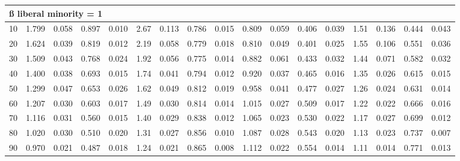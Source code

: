 \documentclass[
]{article}
\begin{document}
\begin{table}[H]
\begin{table}
{\begin{tabular}{r|r|r|r|r|r|r|r|r|r|r|r|r|r|r|r|r}
\hline
\multicolumn{17}{l}{\textbf{ß liberal minority = 1}}\\
\hline
\hspace{1em}10 & 1.799 & 0.058 & 0.897 & 0.010 & 2.67 & 0.113 & 0.786 & 0.015 & 0.809 & 0.059 & 0.406 & 0.039 & 1.51 & 0.136 & 0.444 & 0.043\\
\hline
\hspace{1em}20 & 1.624 & 0.039 & 0.819 & 0.012 & 2.19 & 0.058 & 0.779 & 0.018 & 0.810 & 0.049 & 0.401 & 0.025 & 1.55 & 0.106 & 0.551 & 0.036\\
\hline
\hspace{1em}30 & 1.509 & 0.043 & 0.768 & 0.024 & 1.92 & 0.056 & 0.775 & 0.014 & 0.882 & 0.061 & 0.433 & 0.032 & 1.44 & 0.071 & 0.582 & 0.032\\
\hline
\hspace{1em}40 & 1.400 & 0.038 & 0.693 & 0.015 & 1.74 & 0.041 & 0.794 & 0.012 & 0.920 & 0.037 & 0.465 & 0.016 & 1.35 & 0.026 & 0.615 & 0.015\\
\hline
\hspace{1em}50 & 1.299 & 0.047 & 0.653 & 0.026 & 1.62 & 0.049 & 0.812 & 0.019 & 0.958 & 0.041 & 0.477 & 0.027 & 1.26 & 0.024 & 0.631 & 0.014\\
\hline
\hspace{1em}60 & 1.207 & 0.030 & 0.603 & 0.017 & 1.49 & 0.030 & 0.814 & 0.014 & 1.015 & 0.027 & 0.509 & 0.017 & 1.22 & 0.022 & 0.666 & 0.016\\
\hline
\hspace{1em}70 & 1.116 & 0.031 & 0.560 & 0.015 & 1.40 & 0.029 & 0.838 & 0.012 & 1.065 & 0.023 & 0.530 & 0.022 & 1.17 & 0.027 & 0.699 & 0.012\\
\hline
\hspace{1em}80 & 1.020 & 0.030 & 0.510 & 0.020 & 1.31 & 0.027 & 0.856 & 0.010 & 1.087 & 0.028 & 0.543 & 0.020 & 1.13 & 0.023 & 0.737 & 0.007\\
\hline
\hspace{1em}90 & 0.970 & 0.021 & 0.487 & 0.018 & 1.24 & 0.021 & 0.865 & 0.008 & 1.112 & 0.022 & 0.554 & 0.014 & 1.11 & 0.014 & 0.771 & 0.013\\
\hline
\end{tabular}}
\end{table}
\end{table}
\end{document}
